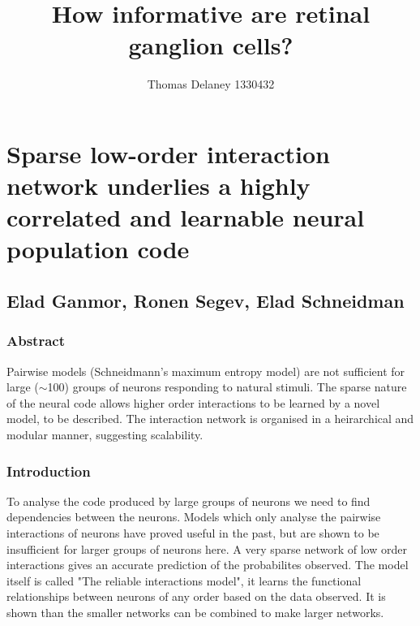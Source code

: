 \documentclass[a4paper,12pt]{article}
\title{How informative are retinal ganglion cells?}
\author{Thomas Delaney 1330432}
\theoremstyle{definition}
\begin{document}
\section*{Sparse low-order interaction network underlies a highly correlated and learnable neural population code}
\subsection*{Elad Ganmor, Ronen Segev, Elad Schneidman}
\subsubsection*{Abstract}
Pairwise models (Schneidmann's maximum entropy model) are not sufficient for large ($\sim$100) groups of neurons responding to natural stimuli. The sparse nature of the neural code allows higher order interactions to be learned by a novel model, to be described. The interaction network is organised in a heirarchical and modular manner, suggesting scalability. 

\subsubsection*{Introduction}
	To analyse the code produced by large groups of neurons we need to find dependencies between the neurons. Models which only analyse the pairwise interactions of neurons have proved useful in the past, but are shown to be insufficient for larger groups of neurons here. A very sparse network of low order interactions gives an accurate prediction of the probabilites observed. The model itself is called "The reliable interactions model", it learns the functional relationships between neurons of any order based on the data observed. It is shown than the smaller networks can be combined to make larger networks.
	
\end{document}
